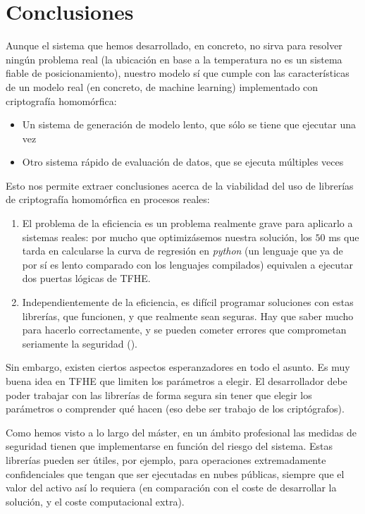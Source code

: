 \chapter{Conclusiones}
\label{chap:conclusiones}

Aunque el sistema que hemos desarrollado, en concreto, no sirva para resolver ningún problema real (la ubicación en base a la temperatura no es un sistema fiable de posicionamiento), nuestro modelo sí que cumple con las características de un modelo real (en concreto, de machine learning) implementado con criptografía homomórfica: 

\begin{itemize}
    \item Un sistema de generación de modelo lento, que sólo se tiene que ejecutar una vez
    \item Otro sistema rápido de evaluación de datos, que se ejecuta múltiples veces
\end{itemize}

Esto nos permite extraer conclusiones acerca de la viabilidad del uso de librerías de criptografía homomórfica en procesos reales:

\begin{enumerate}
    \item El problema de la eficiencia es un problema realmente grave para aplicarlo a sistemas reales: por mucho que optimizásemos nuestra solución, los $50$ ms que tarda en calcularse la curva de regresión en \textit{python} (un lenguaje que ya de por sí es lento comparado con los lenguajes compilados) equivalen a ejecutar dos puertas lógicas de TFHE.
    \item Independientemente de la eficiencia, es difícil programar soluciones con estas librerías, que funcionen, y que realmente sean seguras. Hay que saber mucho para hacerlo correctamente, y se pueden cometer errores que comprometan seriamente la seguridad (\cite{peng_danger_2019}).
\end{enumerate}

Sin embargo, existen ciertos aspectos esperanzadores en todo el asunto. Es muy buena idea en TFHE que limiten los parámetros a elegir. El desarrollador debe poder trabajar con las librerías de forma segura sin tener que elegir los parámetros o comprender qué hacen (eso debe ser trabajo de los criptógrafos).

Como hemos visto a lo largo del máster, en un ámbito profesional las medidas de seguridad tienen que implementarse en función del riesgo del sistema. Estas librerías pueden ser útiles, por ejemplo, para operaciones extremadamente confidenciales que tengan que ser ejecutadas en nubes públicas, siempre que el valor del activo así lo requiera (en comparación con el coste de desarrollar la solución, y el coste computacional extra).

